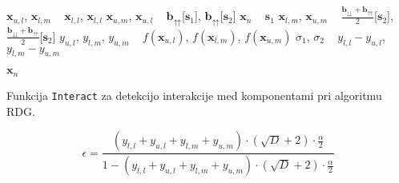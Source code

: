 \begin{algorithm}
    \DontPrintSemicolon

    $\mathbf{x}_{u,l}$, $\mathbf{x}_{l,m}$ \gets~ $\mathbf{x}_{l,l}$, $\mathbf{x}_{l,l}$\;
    $\mathbf{x}_{u,m}$, $\mathbf{x}_{u,l}$ \gets~ $\mathbf{b}_{\upuparrows}$[$\mathbf{s}_1$], $\mathbf{b}_{\upuparrows}$[$\mathbf{s}_2$]\;
    $\mathbf{x}_n$ \gets~ $\mathbf{s}_1$\;
    $\mathbf{x}_{l,m}$, $\mathbf{x}_{u,m}$ \gets~ $\frac{\mathbf{b}_{\downdownarrows} + \mathbf{b}_{\upuparrows}}{2}$[$\mathbf{s}_2$], $\frac{\mathbf{b}_{\downdownarrows} + \mathbf{b}_{\upuparrows}}{2}$[$\mathbf{s}_2$]\;
    $y_{u,l}$, $y_{l,m}$, $y_{u,m}$ \gets~ $f(\mathbf{x}_{u,l})$, $f(\mathbf{x}_{l,m})$, $f(\mathbf{x}_{u,m})$\;
    $\sigma_1$, $\sigma_2$ \gets~ $y_{l,l} - y_{u,l}$, $y_{l,m} - y_{u,m}$\;

    \Return $\mathbf{x}_n$
 
	\caption{Funkcija \texttt{Interact} za detekcijo interakcije med komponentami pri algoritmu RDG.}
	\label{pcode:rdg:interact}
\end{algorithm}


\begin{equation}\label{eq:rdg2:epsilon}
    \epsilon = \frac{(y_{l,l} + y_{u,l} + y_{l,m} + y_{u,m}) \cdot (\sqrt{D} + 2) \cdot \frac{\alpha}{2}}{1 - (y_{l,l} + y_{u,l} + y_{l,m} + y_{u,m}) \cdot (\sqrt{D} + 2) \cdot \frac{\alpha}{2}}
\end{equation}

